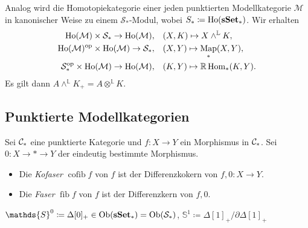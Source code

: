 \documentclass{cheat-sheet}
\newcommand{\ModC}{\mathcal{M}} %
\DeclareMathOperator{\Ho}{Ho} %
\newcommand{\LL}{\mathbb{L}} %
\newcommand{\RR}{\mathbb{R}} %
\newcommand{\Simpl}{\mathcal{S}} %
\DeclareMathOperator{\Map}{Map} %
\DeclareMathOperator{\fib}{fib} %
\DeclareMathOperator{\cofib}{cofib} %
\newcommand{\Sph}{\mathds{S}} %
\newenvironment{centertikzcd}
  {\begin{center}\begin{tikzcd}}
  {\end{tikzcd}\end{center}}
\begin{document}
\begin{satz}
  Analog wird die Homotopiekategorie einer jeden punktierten Modellkategorie $\ModC$ in kanonischer Weise zu einem $\Simpl_*$-Modul, wobei $S_* \coloneqq \Ho(\sSet_*)$.
  Wir erhalten
  \begin{align*}
    \Ho(\ModC) \times \Simpl_* \to \Ho(\ModC), \quad & (X, K) \mapsto X \wedge^{\LL} K, \\
    \Ho(\ModC)^\op \times \Ho(\ModC) \to \Simpl_*, \quad & (X, Y) \mapsto \Map_*(X, Y), \\
    \Simpl_*^\op \times \Ho(\ModC) \to \Ho(\ModC), \quad & (K, Y) \mapsto \RR \Hom_*(K, Y).
  \end{align*}
  Es gilt dann $A \wedge^{\LL} K_+ = A \otimes^{\LL} K$.
\end{satz}


\subsection{Punktierte Modellkategorien}

\begin{defn}
  Sei $\mathcal{C}_*$ eine punktierte Kategorie und $f : X \to Y$ ein Morphismus in $\mathcal{C}_*$.
  Sei $0 : X \to * \to Y$ der eindeutig bestimmte Morphismus.
  \begin{itemize}
    \item Die \emph{Kofaser} $\cofib f$ von $f$ ist der Differenzkokern von $f, 0 : X \to Y$.
    \item Die \emph{Faser} $\fib f$ von $f$ ist der Differenzkern von $f, 0$.
  \end{itemize}
\end{defn}


\begin{defn}
  $\Sph^0 \coloneqq \Delta[0]_{+} \in \Ob(\sSet_*) = \Ob(\Simpl_*)$, \quad
  $\Sph^1 \coloneqq \Delta[1]_{+} / \partial \Delta[1]_{+}$
\end{defn}
\end{document}
